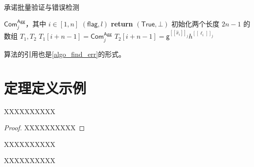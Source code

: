 \begin{algorithm}[!htbp]
    \caption{承诺批量验证与错误检测}
    \label{algo_find_err}
    \begin{algorithmic}[1] %
        \Require $\mathsf{Com}^{\mathsf{Agg}}_{j}$，其中 $i \in [1,n]$
        \Ensure  $(\mathsf{flag}, l)$
            \State \textbf{return} $(\mathsf{True}, \bot)$ 
        \EndIf
        \State 初始化两个长度 $2n - 1$ 的数组 $T_1, T_2$ 
            \State $T_1[i + n - 1] = \mathsf{Com}^{\mathsf{Agg}}_{j}$
            \State $T_2[i + n - 1] = \mathsf{g}^{[\![ \hat{x}_{i} ]\!]_{j}}h^{[\![ \ell_{i} ]\!]_{j}}$
        \EndFor
        \EndWhile
        \EndFunction
    \end{algorithmic}
\end{algorithm}

算法的引用也是\cref{algo_find_err}的形式。

\section{定理定义示例}

\begin{theorem}
    XXXXXXXXXX
\end{theorem}
\begin{proof}
    XXXXXXXXXX
\end{proof}
\begin{corollary}
    XXXXXXXXXX
\end{corollary}
\begin{lemma}
    XXXXXXXXXX
\end{lemma}

